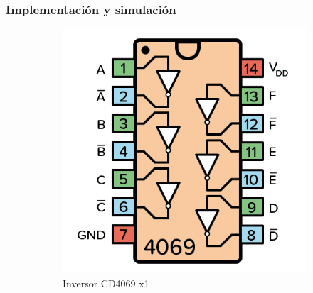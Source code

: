 
\subsubsection{Implementación y simulación}
\begin{center}
\begin{figure}[h!]
\centering
\begin{subfigure}[b]{0.45\linewidth}
\includegraphics[width=\linewidth]{./imagenes/cd4069.png}
\caption{Inversor CD4069 x1}
\end{subfigure}
\begin{subfigure}[b]{0.45\linewidth}

\end{subfigure}
\end{figure}
\end{center}
